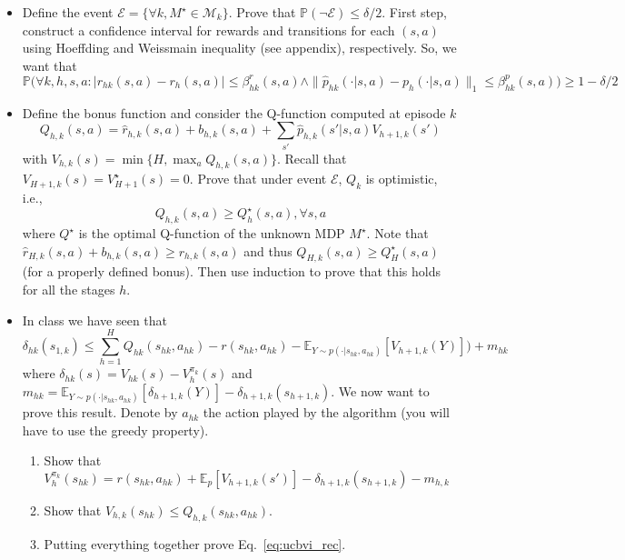 \documentclass[a4paper]{article}
\newcommand{\wh}[1]{\widehat{#1}}
\begin{document}
\begin{itemize}
    \item Define the event $\mathcal{E} = \{\forall k, M^\star \in \mathcal{M}_k\}$. Prove that $\mathbb{P}(\neg\mathcal{E}) \leq \delta/2$. First step, construct a confidence interval for rewards and transitions for each $(s,a)$ using Hoeffding and Weissmain inequality (see appendix), respectively. So, we want that
    \[
        \mathbb{P}\Big(\forall k,h,s,a : |r_{hk}(s,a) - r_h(s,a)| \leq \beta_{hk}^r(s,a) \wedge \|\wh{p}_{hk}(\cdot|s,a) - p_{h}(\cdot|s,a)\|_1\leq \beta_{hk}^p(s,a)\Big) \geq 1-\delta/2
    \]
    
    \item Define the bonus function and consider the Q-function computed at episode $k$
    \[
        Q_{h,k}(s,a) = \wh{r}_{h,k}(s,a) + b_{h,k}(s,a) + \sum_{s'} \wh{p}_{h,k}(s'|s,a) V_{h+1,k}(s')
    \]
    with $V_{h,k}(s) = \min\{H, \max_a Q_{h,k}(s,a)\}$. Recall that $V_{H+1,k}(s) = V_{H+1}^\star(s) = 0$.
    Prove that under event $\mathcal{E}$, $Q_k$ is optimistic, i.e.,
    \[
        Q_{h,k}(s,a) \geq Q^{\star}_h(s,a), \forall s,a
    \]
    where $Q^\star$ is the optimal Q-function of the unknown MDP $M^\star$.
    Note that $\wh{r}_{H,k}(s,a) + b_{h,k}(s,a) \geq r_{h,k}(s,a)$ and thus $Q_{H,k}(s,a) \geq Q^\star_H(s,a)$ (for a properly defined bonus). Then use induction to prove that this holds for all the stages $h$.

    \item In class we have seen that
    \begin{equation}
        \label{eq:ucbvi_rec}
        \delta_{hk}(s_{1,k}) \leq \sum_{h=1}^H Q_{hk}(s_{hk},a_{hk}) - r(s_{hk},a_{hk}) - \mathbb{E}_{Y\sim p(\cdot|s_{hk},a_{hk})}[V_{h+1,k}(Y)]) + m_{hk}
    \end{equation}
    where $\delta_{hk}(s)=V_{hk}(s) - V_h^{\pi_k}(s)$ and $m_{hk} = \mathbb{E}_{Y\sim p(\cdot|s_{hk},a_{hk})}[\delta_{h+1,k}(Y)] - \delta_{h+1,k}(s_{h+1,k})$.
    We now want to prove this result. Denote by $a_{hk}$ the action played by the algorithm (you will have to use the greedy property).
    \begin{enumerate}
        \item Show that $V^{\pi_{k}}_h(s_{hk}) = r(s_{hk},a_{hk}) + \mathbb{E}_{p}[V_{h+1,k}(s')] - \delta_{h+1,k}(s_{h+1,k}) - m_{h,k}$
        \item Show that $V_{h,k}(s_{hk}) \leq Q_{h,k}(s_{hk},a_{hk})$.
        \item Putting everything together prove Eq.~\ref{eq:ucbvi_rec}.
    \end{enumerate}


\end{itemize}
\end{document}
